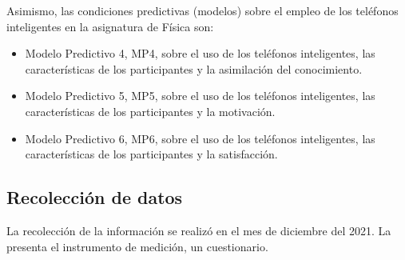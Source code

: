 \documentclass[spanish]{textolivre}
\begin{document}
Asimismo, las condiciones predictivas (modelos) sobre el empleo de los teléfonos inteligentes en la asignatura de Física son:

\begin{itemize}
  \item Modelo Predictivo 4, MP4, sobre el uso de los teléfonos inteligentes, las características de los participantes y la asimilación del conocimiento. 
  \item Modelo Predictivo 5, MP5, sobre el uso de los teléfonos inteligentes, las características de los participantes y la motivación. 
  \item Modelo Predictivo 6, MP6, sobre el uso de los teléfonos inteligentes, las características de los participantes y la satisfacción. 
\end{itemize}

\subsection{Recolección de datos}
La recolección de la información se realizó en el mes de diciembre del 2021. La  presenta el instrumento de medición, un cuestionario.
\end{document}
